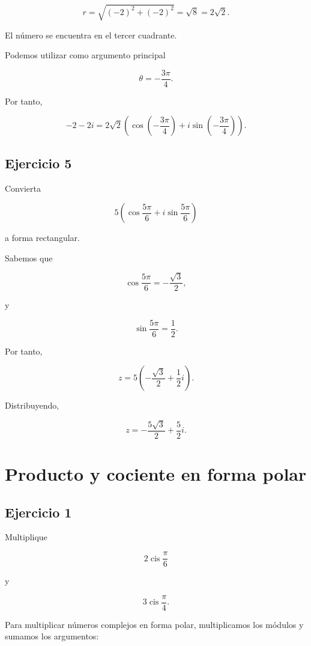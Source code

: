 \documentclass[12pt]{article}
\begin{document}
\[
r
=
\sqrt{(-2)^2+(-2)^2}
=
\sqrt8
=
2\sqrt2.
\]

El número se encuentra en el tercer cuadrante.

Podemos utilizar como argumento principal

\[
\theta=-\frac{3\pi}{4}.
\]

Por tanto,

\[
\boxed{
-2-2i
=
2\sqrt2
\left(
\cos\left(-\frac{3\pi}{4}\right)
+i\sin\left(-\frac{3\pi}{4}\right)
\right)
}.
\]


\subsection*{Ejercicio 5}

Convierta

\[
5\left(
\cos\frac{5\pi}{6}
+i\sin\frac{5\pi}{6}
\right)
\]

a forma rectangular.

Sabemos que

\[
\cos\frac{5\pi}{6}
=
-\frac{\sqrt3}{2},
\]

y

\[
\sin\frac{5\pi}{6}
=
\frac12.
\]

Por tanto,

\[
z
=
5
\left(
-\frac{\sqrt3}{2}
+\frac12i
\right).
\]

Distribuyendo,

\[
\boxed{
z
=
-\frac{5\sqrt3}{2}
+
\frac52i
}.
\]

\section*{Producto y cociente en forma polar}

\subsection*{Ejercicio 1}

Multiplique

\[
2\operatorname{cis}\frac{\pi}{6}
\]

y

\[
3\operatorname{cis}\frac{\pi}{4}.
\]

Para multiplicar números complejos en forma polar, multiplicamos los
módulos y sumamos los argumentos:
\end{document}

